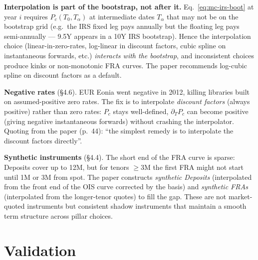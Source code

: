 \documentclass[11pt,a4paper]{article}
\begin{document}
\begin{commentary}
\textbf{Interpolation is part of the bootstrap, not after it.}
Eq.~\eqref{eq:mc-irs-boot} at year $i$ requires $P_c(T_0, T_\alpha)$
at intermediate dates $T_\alpha$ that may not be on the bootstrap
grid (e.g.\ the IRS fixed leg pays annually but the floating leg
pays semi-annually --- 9.5Y appears in a 10Y IRS bootstrap). Hence
the interpolation choice (linear-in-zero-rates, log-linear in
discount factors, cubic spline on instantaneous forwards, etc.)
\emph{interacts with the bootstrap}, and inconsistent choices
produce kinks or non-monotonic FRA curves. The paper recommends
log-cubic spline on discount factors as a default.
\end{commentary}

\begin{commentary}
\textbf{Negative rates} (\S4.6). EUR Eonia went negative in 2012,
killing libraries built on assumed-positive zero rates. The fix is
to interpolate \emph{discount factors} (always positive) rather than
zero rates: $P_c$ stays well-defined, $\partial_T P_c$ can become
positive (giving negative instantaneous forwards) without crashing
the interpolator. Quoting from the paper (p.~44): ``the simplest
remedy is to interpolate the discount factors directly''.
\end{commentary}

\begin{commentary}
\textbf{Synthetic instruments} (\S4.4). The short end of the FRA
curve is sparse: Deposits cover up to 12M, but for tenors $\ge 3$M
the first FRA might not start until 1M or 3M from spot. The paper
constructs \emph{synthetic Deposits} (interpolated from the front
end of the OIS curve corrected by the basis) and \emph{synthetic
FRAs} (interpolated from the longer-tenor quotes) to fill the gap.
These are not market-quoted instruments but consistent shadow
instruments that maintain a smooth term structure across pillar
choices.
\end{commentary}

\section{Validation}
\end{document}

